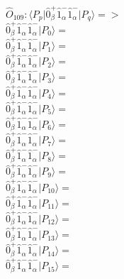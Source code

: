 \documentclass[14pt]{article}
\begin{document}
    $\hat{O}_{109}:  \langle{P_p}\vert \hat{0}_{\beta}^{+}\hat{1}_{\alpha}^{-}\hat{1}_{\alpha}^{-} \vert{P_q}\rangle => $ \\ 
    $ \hat{0}_{\beta}^{+}\hat{1}_{\alpha}^{-}\hat{1}_{\alpha}^{-} \vert{P_{0}}\rangle =  $ \\ 
    $ \hat{0}_{\beta}^{+}\hat{1}_{\alpha}^{-}\hat{1}_{\alpha}^{-} \vert{P_{1}}\rangle =  $ \\ 
    $ \hat{0}_{\beta}^{+}\hat{1}_{\alpha}^{-}\hat{1}_{\alpha}^{-} \vert{P_{2}}\rangle =  $ \\ 
    $ \hat{0}_{\beta}^{+}\hat{1}_{\alpha}^{-}\hat{1}_{\alpha}^{-} \vert{P_{3}}\rangle =  $ \\ 
    $ \hat{0}_{\beta}^{+}\hat{1}_{\alpha}^{-}\hat{1}_{\alpha}^{-} \vert{P_{4}}\rangle =  $ \\ 
    $ \hat{0}_{\beta}^{+}\hat{1}_{\alpha}^{-}\hat{1}_{\alpha}^{-} \vert{P_{5}}\rangle =  $ \\ 
    $ \hat{0}_{\beta}^{+}\hat{1}_{\alpha}^{-}\hat{1}_{\alpha}^{-} \vert{P_{6}}\rangle =  $ \\ 
    $ \hat{0}_{\beta}^{+}\hat{1}_{\alpha}^{-}\hat{1}_{\alpha}^{-} \vert{P_{7}}\rangle =  $ \\ 
    $ \hat{0}_{\beta}^{+}\hat{1}_{\alpha}^{-}\hat{1}_{\alpha}^{-} \vert{P_{8}}\rangle =  $ \\ 
    $ \hat{0}_{\beta}^{+}\hat{1}_{\alpha}^{-}\hat{1}_{\alpha}^{-} \vert{P_{9}}\rangle =  $ \\ 
    $ \hat{0}_{\beta}^{+}\hat{1}_{\alpha}^{-}\hat{1}_{\alpha}^{-} \vert{P_{10}}\rangle =  $ \\ 
    $ \hat{0}_{\beta}^{+}\hat{1}_{\alpha}^{-}\hat{1}_{\alpha}^{-} \vert{P_{11}}\rangle =  $ \\ 
    $ \hat{0}_{\beta}^{+}\hat{1}_{\alpha}^{-}\hat{1}_{\alpha}^{-} \vert{P_{12}}\rangle =  $ \\ 
    $ \hat{0}_{\beta}^{+}\hat{1}_{\alpha}^{-}\hat{1}_{\alpha}^{-} \vert{P_{13}}\rangle =  $ \\ 
    $ \hat{0}_{\beta}^{+}\hat{1}_{\alpha}^{-}\hat{1}_{\alpha}^{-} \vert{P_{14}}\rangle =  $ \\ 
    $ \hat{0}_{\beta}^{+}\hat{1}_{\alpha}^{-}\hat{1}_{\alpha}^{-} \vert{P_{15}}\rangle =  $ \\ 
    
\end{document}
